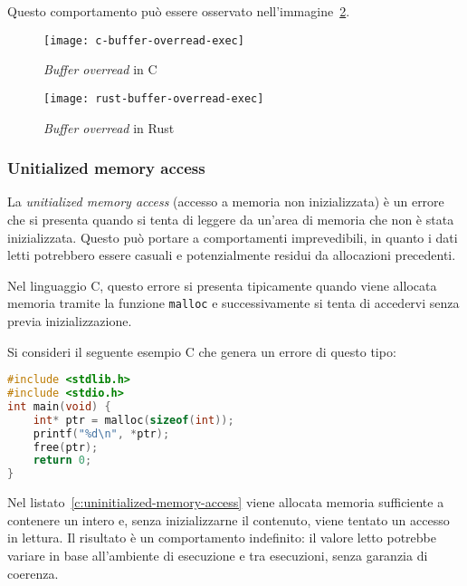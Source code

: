 Questo comportamento può essere osservato nell'immagine~\ref{rust:buffer-overread-exec}.
\begin{figure}[htbp]
\begin{center}
    \texttt{[image: c-buffer-overread-exec]}
    \caption{\textit{Buffer overread} in C}\label{c:buffer-overread-exec}
    \end{center}
\end{figure}
\begin{figure}[htbp]
\begin{center}
    \texttt{[image: rust-buffer-overread-exec]}
    \caption{\textit{Buffer overread} in Rust}\label{rust:buffer-overread-exec}
    \end{center}
\end{figure}

\subsubsection{Unitialized memory access} 
La \textit{unitialized memory access} (accesso a memoria non inizializzata) è un errore che si presenta
 quando si tenta di leggere da un'area di memoria che non è stata 
 inizializzata. Questo può portare a comportamenti imprevedibili, in quanto 
 i dati letti potrebbero essere casuali e potenzialmente 
 residui da allocazioni precedenti.

Nel linguaggio C, questo errore si presenta tipicamente quando viene 
allocata memoria tramite la funzione \texttt{malloc} e successivamente si tenta di 
accedervi senza previa inizializzazione.

Si consideri il seguente esempio C che genera un errore di questo tipo:
\begin{lstlisting}[language=C, caption={Uninitialized memory access in C}, label={c:uninitialized-memory-access}]
#include <stdlib.h>
#include <stdio.h>
int main(void) {
    int* ptr = malloc(sizeof(int));
    printf("%d\n", *ptr);
    free(ptr);
    return 0;
}
\end{lstlisting}
Nel listato~\ref{c:uninitialized-memory-access} viene allocata memoria sufficiente a contenere un intero e, senza inizializzarne il contenuto,
viene tentato un accesso in lettura. 
Il risultato è un comportamento indefinito: il valore letto potrebbe variare in base all'ambiente di esecuzione e tra esecuzioni, senza garanzia di coerenza.

